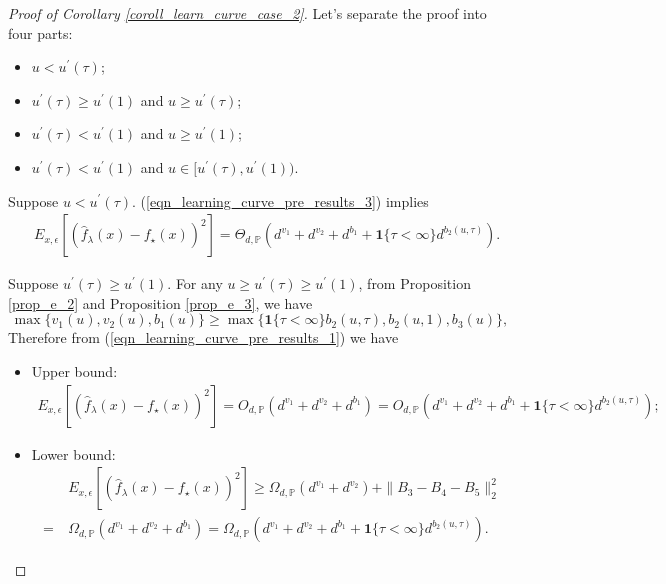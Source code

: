 \documentclass{article}
\theoremstyle{plain}
\theoremstyle{definition}
\theoremstyle{remark}
\begin{document}
\begin{appendix}
\begin{proof}[Proof of Corollary \ref{coroll_learn_curve_case_2}]
Let's separate the proof into four parts:
\begin{itemize}
    \item [(i)] $u < u^{\prime}(\tau)$; 
    \item [(ii)] $u^{\prime}(\tau) \geq u^{\prime}(1)$ and $u \geq u^{\prime}(\tau)$;
    \item [(iii)] $u^{\prime}(\tau) < u^{\prime}(1)$ and $u \geq u^{\prime}(1)$; 
    \item [(iv)] $u^{\prime}(\tau) < u^{\prime}(1)$ and $u \in [u^{\prime}(\tau), u^{\prime}(1))$.
\end{itemize}





 Suppose $u < u^{\prime}(\tau)$. (\ref{eqn_learning_curve_pre_results_3}) implies
\begin{align*}
&~E_{x, \epsilon} \left[ \left(\hat{f}_{\lambda}(x) - f_{\star}(x) \right)^{2} \right]
=
\Theta_{d, \mathbb{P}} \left( d^{v_1} + d^{v_2} + d^{b_1} + \mathbf{1}\{\tau<\infty\}d^{b_2(u, \tau)}\right).
\end{align*}

 Suppose $u^{\prime}(\tau) \geq u^{\prime}(1)$. For any $u \geq u^{\prime}(\tau) \geq u^{\prime}(1)$, from Proposition \ref{prop_e_2} and Proposition \ref{prop_e_3}, we have
\begin{equation*}
    \max\{v_1(u), v_2(u), b_1(u)\} \geq \max\{\mathbf{1}\{\tau<\infty\} b_2(u, \tau), b_2(u, 1), b_3(u)\},
\end{equation*}
Therefore from (\ref{eqn_learning_curve_pre_results_1}) we have
\begin{itemize}
    \item Upper bound:
    \begin{align*}
E_{x, \epsilon} \left[ \left(\hat{f}_{\lambda}(x) - f_{\star}(x) \right)^{2} \right]
=
O_{d, \mathbb{P}} \left( d^{v_1} + d^{v_2} + d^{b_1}\right)
=
O_{d, \mathbb{P}} \left( d^{v_1} + d^{v_2} + d^{b_1} + \mathbf{1}\{\tau<\infty\}d^{b_2(u, \tau)}\right);
\end{align*}

\item Lower bound:
\begin{align*}
&~ E_{x, \epsilon} \left[ \left(\hat{f}_{\lambda}(x) - f_{\star}(x) \right)^{2} \right]
\geq  \Omega_{d, \mathbb{P}} \left( d^{v_1} + d^{v_2} \right) + \|B_3-B_4-B_5\|_{2}^{2}\\
= &~
\Omega_{d, \mathbb{P}} \left( d^{v_1} + d^{v_2} + d^{b_1}\right)
=
\Omega_{d, \mathbb{P}} \left( d^{v_1} + d^{v_2} + d^{b_1} + \mathbf{1}\{\tau<\infty\}d^{b_2(u, \tau)}\right).
\end{align*}



\end{itemize}
\end{proof}
\end{appendix}
\end{document}
